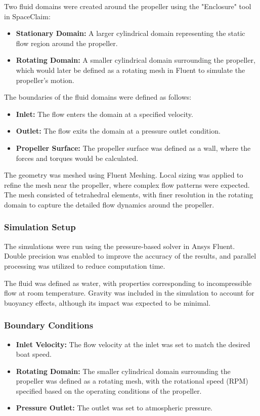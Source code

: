 \documentclass{article}
\begin{document}
Two fluid domains were created around the propeller using the "Enclosure" tool in SpaceClaim:
\begin{itemize}
    \item \textbf{Stationary Domain:} A larger cylindrical domain representing the static flow region around the propeller.
    \item \textbf{Rotating Domain:} A smaller cylindrical domain surrounding the propeller, which would later be defined as a rotating mesh in Fluent to simulate the propeller's motion.
\end{itemize}

The boundaries of the fluid domains were defined as follows:
\begin{itemize}
    \item \textbf{Inlet:} The flow enters the domain at a specified velocity.
    \item \textbf{Outlet:} The flow exits the domain at a pressure outlet condition.
    \item \textbf{Propeller Surface:} The propeller surface was defined as a wall, where the forces and torques would be calculated.
\end{itemize}

The geometry was meshed using Fluent Meshing. Local sizing was applied to refine the mesh near the propeller, where complex flow patterns were expected. The mesh consisted of tetrahedral elements, with finer resolution in the rotating domain to capture the detailed flow dynamics around the propeller.

\subsubsection{Simulation Setup}
The simulations were run using the pressure-based solver in Ansys Fluent. Double precision was enabled to improve the accuracy of the results, and parallel processing was utilized to reduce computation time.

The fluid was defined as water, with properties corresponding to incompressible flow at room temperature. Gravity was included in the simulation to account for buoyancy effects, although its impact was expected to be minimal.

\subsubsection{Boundary Conditions}
\begin{itemize}
    \item \textbf{Inlet Velocity:} The flow velocity at the inlet was set to match the desired boat speed.
    \item \textbf{Rotating Domain:} The smaller cylindrical domain surrounding the propeller was defined as a rotating mesh, with the rotational speed (RPM) specified based on the operating conditions of the propeller.
    \item \textbf{Pressure Outlet:} The outlet was set to atmospheric pressure.
\end{itemize}
\end{document}
